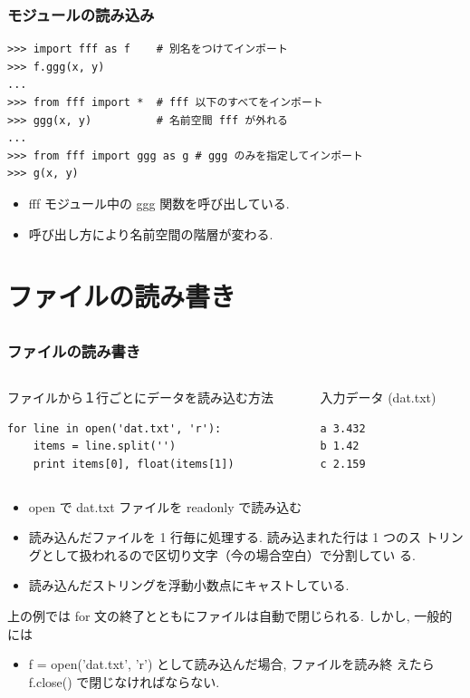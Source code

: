 \begin{frame}[t,fragile]
\frametitle{モジュールの読み込み}
\begin{lstlisting}
>>> import fff as f    # 別名をつけてインポート
>>> f.ggg(x, y)
...
>>> from fff import *  # fff 以下のすべてをインポート
>>> ggg(x, y)          # 名前空間 fff が外れる
...
>>> from fff import ggg as g # ggg のみを指定してインポート
>>> g(x, y)
\end{lstlisting}
\begin{itemize}
\item fff モジュール中の ggg 関数を呼び出している. 
\item 呼び出し方により名前空間の階層が変わる. 
\end{itemize}

\end{frame}

\section{ファイルの読み書き}
\subsection*{\redm\whitem\greenb}

\begin{frame}[t,fragile]
\frametitle{ファイルの読み書き}
\begin{columns}
\begin{column}{8cm}
ファイルから１行ごとにデータを読み込む方法
\begin{lstlisting}
for line in open('dat.txt', 'r'):
    items = line.split('')
    print items[0], float(items[1])
\end{lstlisting}
\end{column}
\begin{column}{4cm}
入力データ (dat.txt)
\begin{lstlisting}
a 3.432
b 1.42
c 2.159
\end{lstlisting}
\end{column}
\end{columns}

\begin{itemize}
\item open で dat.txt ファイルを readonly で読み込む
\item 読み込んだファイルを 1 行毎に処理する. 読み込まれた行は 1 つのス
      トリングとして扱われるので区切り文字（今の場合空白）で分割してい
      る. 
\item 読み込んだストリングを浮動小数点にキャストしている. 
\end{itemize}
上の例では for 文の終了とともにファイルは自動で閉じられる. しかし, 一般的には
\begin{itemize}
\item f = open('dat.txt', 'r') として読み込んだ場合, ファイルを読み終
      えたら f.close() で閉じなければならない. 
\end{itemize}
\end{frame}

